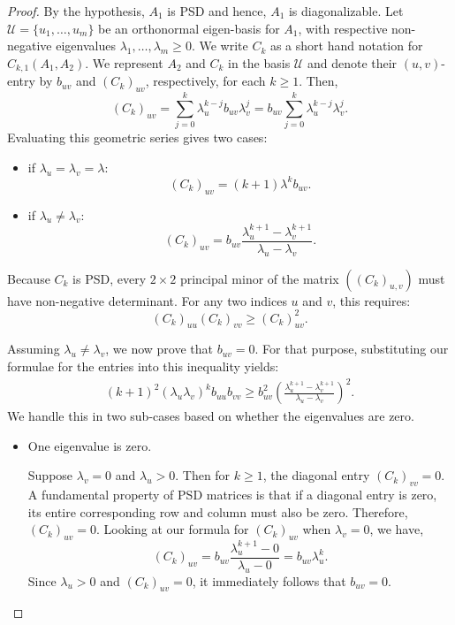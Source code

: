 \documentclass[11pt,reqno]{amsart}
\theoremstyle{plain}
\theoremstyle{definition}
\numberwithin{equation}{section}
\begin{document}
\begin{proof}
By the hypothesis, $A_1$ is PSD and hence, $A_1$ is diagonalizable. Let $\mathcal{U}=\{u_1, \dots, u_m\}$ be an orthonormal eigen-basis for $A_1$, with respective non-negative eigenvalues $\lambda_1, \dots, \lambda_m \ge 0$. We write $C_k$ as a short hand notation for $C_{k, 1}(A_1, A_2)$. We represent $A_2$ and $C_k$ in the basis $\mathcal{U}$ and denote their $(u, v)$-entry by $b_{uv}$ and $(C_k)_{uv}$, respectively, for each $k\geq 1$. Then,
$$
(C_k)_{uv} = \sum_{j=0}^{k} \lambda_u^{k-j} b_{uv} \lambda_v^j = b_{uv} \sum_{j=0}^{k} \lambda_u^{k-j} \lambda_v^j.
$$
Evaluating this geometric series gives two cases: 
\begin{itemize}
    \item[(i)] if $\lambda_u = \lambda_v = \lambda$:
$$(C_k)_{uv} = (k+1) \lambda^k b_{uv}.$$

\item[(ii)] if $\lambda_u \neq \lambda_v$:
$$(C_k)_{uv} = b_{uv} \frac{\lambda_u^{k+1} - \lambda_v^{k+1}}{\lambda_u - \lambda_v}.$$
\end{itemize}

Because $C_k$ is PSD, every $2 \times 2$ principal minor of the matrix $((C_k)_{u,v})$ must have non-negative determinant. For any two indices $u$ and $v$, this requires:
$$(C_k)_{uu} (C_k)_{vv} \ge (C_k)_{uv}^2.$$

Assuming $\lambda_u \neq \lambda_v$, we now prove that $b_{uv} = 0$. 
For that purpose, substituting our formulae for the entries into this inequality yields:
\begin{align}\label{Eq:matrix-comm}
    (k+1)^2 (\lambda_u \lambda_v)^k b_{uu} b_{vv} \ge b_{uv}^2 \left( \frac{\lambda_u^{k+1} - \lambda_v^{k+1}}{\lambda_u - \lambda_v} \right)^2.
\end{align}
 We handle this in two sub-cases based on whether the eigenvalues are zero.
\begin{itemize}
    \item[\text{Case 1.}] One eigenvalue is zero.

Suppose $\lambda_v = 0$ and $\lambda_u > 0$. Then for $k \ge 1$, the diagonal entry $(C_k)_{vv} = 0$.
A fundamental property of PSD matrices is that if a diagonal entry is zero, its entire corresponding row and column must also be zero. Therefore, $(C_k)_{uv} = 0$.
Looking at our formula for $(C_k)_{uv}$ when $\lambda_v = 0$, we have,
$$
(C_k)_{uv} = b_{uv} \frac{\lambda_u^{k+1} - 0}{\lambda_u - 0} = b_{uv} \lambda_u^k.
$$
Since $\lambda_u > 0$ and $(C_k)_{uv} = 0$, it immediately follows that $b_{uv} = 0$.


\end{itemize}
\end{proof}
\end{document}
